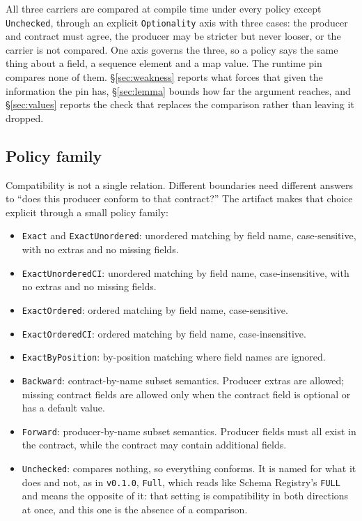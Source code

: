 All three carriers are compared at compile time under every policy except \texttt{Unchecked}, through an explicit \texttt{Optionality} axis with three cases: the producer and contract must agree, the producer may be stricter but never looser, or the carrier is not compared. One axis governs the three, so a policy says the same thing about a field, a sequence element and a map value. The runtime pin compares none of them. \S\ref{sec:weakness} reports what forces that given the information the pin has, \S\ref{sec:lemma} bounds how far the argument reaches, and \S\ref{sec:values} reports the check that replaces the comparison rather than leaving it dropped.

\subsection{Policy family}

Compatibility is not a single relation. Different boundaries need different answers to ``does this producer conform to that contract?'' The artifact makes that choice explicit through a small policy family:

\begin{itemize}[leftmargin=1.5em]
  \item \texttt{Exact} and \texttt{ExactUnordered}: unordered matching by field name, case-sensitive, with no extras and no missing fields.
  \item \texttt{ExactUnorderedCI}: unordered matching by field name, case-insensitive, with no extras and no missing fields.
  \item \texttt{ExactOrdered}: ordered matching by field name, case-sensitive.
  \item \texttt{ExactOrderedCI}: ordered matching by field name, case-insensitive.
  \item \texttt{ExactByPosition}: by-position matching where field names are ignored.
  \item \texttt{Backward}: contract-by-name subset semantics. Producer extras are allowed; missing contract fields are allowed only when the contract field is optional or has a default value.
  \item \texttt{Forward}: producer-by-name subset semantics. Producer fields must all exist in the contract, while the contract may contain additional fields.
  \item \texttt{Unchecked}: compares nothing, so everything conforms. It is named for what it does and not, as in \texttt{v0.1.0}, \texttt{Full}, which reads like Schema Registry's \texttt{FULL} and means the opposite of it: that setting is compatibility in both directions at once, and this one is the absence of a comparison.
\end{itemize}

